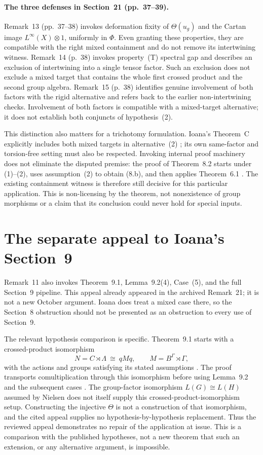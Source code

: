 \documentclass[11pt]{article}
\begin{document}
\paragraph{The three defenses in Section~21 (pp.~37--39).}
Remark~13 (pp.~37--38) invokes deformation fixity of $\Theta(u_g)$ and
the Cartan image $L^\infty(X)\otimes1$, uniformly in $\Phi$.
Even granting these properties, they are compatible with the right mixed
containment and do not remove its intertwining witness.
Remark~14 (p.~38) invokes property~(T) spectral gap and describes an
exclusion of intertwining into a single tensor factor. Such an exclusion
does not exclude a mixed target that contains the whole first crossed
product and the second group algebra.
Remark~15 (p.~38) identifies genuine involvement of both factors with the
rigid alternative and refers back to the earlier non-intertwining checks.
Involvement of both factors is compatible with a mixed-target alternative;
it does not establish both conjuncts of hypothesis~(2).

This distinction also matters for a trichotomy formulation. Ioana's
Theorem~C explicitly includes both mixed targets in alternative~(2)
\cite[p.~1179]{Ioana2011}; its own same-factor and torsion-free setting
must also be respected. Invoking internal proof machinery does not eliminate
the disputed premise: the proof of Theorem~8.2 starts under (1)--(2),
uses assumption~(2) to obtain (8.b), and then applies Theorem~6.1
\cite[pp.~1208--1209]{Ioana2011}. The existing containment witness is
therefore still decisive for this particular application. This is
non-licensing by the theorem, not nonexistence of group morphisms or a
claim that its conclusion could never hold for special inputs.

\section{The separate appeal to Ioana's Section~9}

Remark~11 also invokes Theorem~9.1, Lemma~9.2(4), Case~(5), and the
full Section~9 pipeline. This appeal already appeared in the archived
Remark~21; it is not a new October argument. Ioana does treat a mixed
case there, so the Section~8 obstruction should not be presented as an
obstruction to every use of Section~9.

The relevant hypothesis comparison is specific. Theorem~9.1 starts with
a crossed-product isomorphism
\[
 N=C\rtimes\Lambda\ \cong\ qMq,
 \qquad M=B^\Gamma\rtimes\Gamma,
\]
with the actions and groups satisfying its stated assumptions
\cite[Theorem~9.1, p.~1213]{Ioana2011}. The proof transports
comultiplication through this isomorphism before using Lemma~9.2 and
the subsequent cases \cite[pp.~1214--1217]{Ioana2011}.
The group-factor isomorphism $L(G)\cong L(H)$ assumed by Nielsen does
not itself supply this crossed-product-isomorphism setup. Constructing
the injective $\Theta$ is not a construction of that isomorphism, and the
cited appeal supplies no hypothesis-by-hypothesis replacement. Thus the
reviewed appeal demonstrates no repair of the application at issue.
This is a comparison with the published hypotheses, not a new theorem
that such an extension, or any alternative argument, is impossible.
\end{document}
